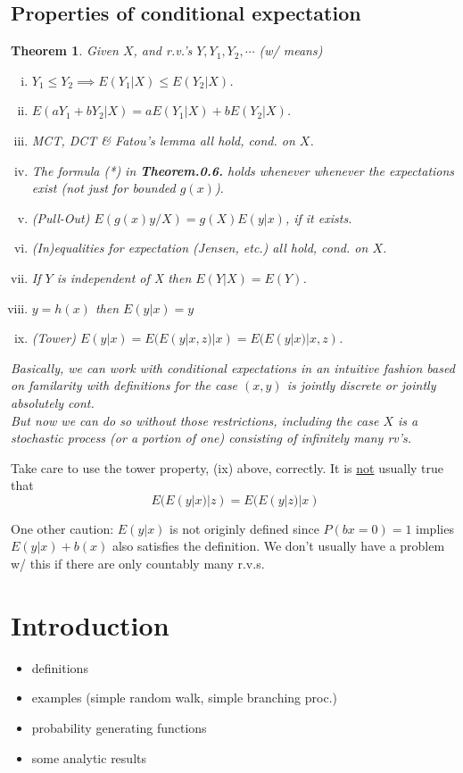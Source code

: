 \documentclass[12pt]{article}
\theoremstyle{definition}
\theoremstyle{plain}
\newtheorem{mythm}{Theorem}[section]
\begin{document}
\subsection*{Properties of conditional expectation}
\begin{mythm}
Given $X$, and r.v.'s $Y, Y_1, Y_2, \cdots$ (w/ means)
\begin{enumerate}[(i)]
\item $Y_1 \leq Y_2 \implies E(Y_1|X) \leq E(Y_2|X)$.
\item $E(aY_1 + bY_2|X) = aE(Y_1|X) + bE(Y_2|X)$.
\item MCT, DCT \& Fatou's lemma all hold, cond. on $X$.
\item The formula (*) in \textbf{Theorem.0.6.} holds whenever whenever the expectations exist (not just for bounded $g(x)$).
\item (Pull-Out) $E(g(x)y/X) = g(X) E(y|x)$, if it exists.
\item (In)equalities for expectation (Jensen, etc.) all hold, cond. on $X$.
\item If $Y$ is independent of X then $E(Y|X) = E(Y)$.
\item $y=h(x)$ then $E(y|x) = y$
\item (Tower) $E(y|x)=E(E(y|x,z)|x) = E(E(y|x)|x,z)$.
\end{enumerate}
Basically, we can work with conditional expectations in an intuitive fashion based on familarity with definitions for the case $(x,y)$ is jointly discrete or jointly absolutely cont. \\
But now we can do so without those restrictions, including the case $X$ is a stochastic process (or a portion of one) consisting of infinitely many rv's.
\end{mythm}
Take care to use the tower property, (ix) above, correctly. It is \underline{not} usually true that \[E(E(y|x)|z) = E(E(y|z)|x)\] 

One other caution: $E(y|x)$ is not originly defined since $P(b{x}=0)=1$ implies $E(y|x) + b(x)$ also satisfies the definition. We don't usually have a problem w/ this if there are only countably many r.v.s.

\newpage

\section{Introduction}
\begin{itemize}
\item definitions
\item examples (simple random walk, simple branching proc.)
\item probability generating functions
\item some analytic results
\end{itemize}
\end{document}
